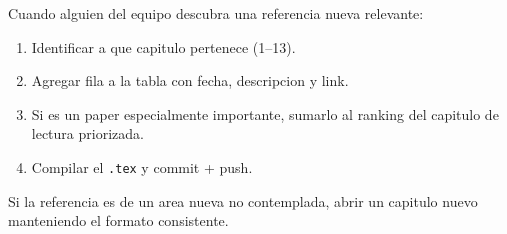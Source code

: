\documentclass[11pt,a4paper,oneside]{report}
\begin{document}
Cuando alguien del equipo descubra una referencia nueva relevante:

\begin{enumerate}[leftmargin=2em]
  \item Identificar a que capitulo pertenece (1--13).
  \item Agregar fila a la tabla con fecha, descripcion y link.
  \item Si es un paper especialmente importante, sumarlo al ranking del
        capitulo de lectura priorizada.
  \item Compilar el \texttt{.tex} y commit + push.
\end{enumerate}

Si la referencia es de un area nueva no contemplada, abrir un capitulo
nuevo manteniendo el formato consistente.
\end{document}
